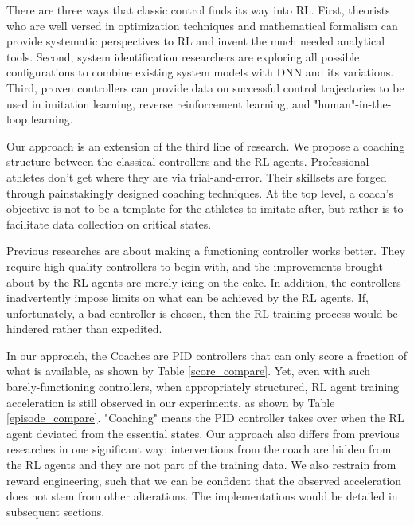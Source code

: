 There are three ways that classic control finds its way into RL. First, theorists who are well versed in optimization techniques and mathematical formalism can provide systematic perspectives to RL and invent the much needed analytical tools\cite{Han2020ActorCriticRL}\cite{Weinan2017APO}\cite{Dupont2019AugmentedNO}\cite{Betancourt2018OnSO}\cite{Nachum2020ReinforcementLV}. Second, system identification researchers are exploring all possible configurations to combine existing system models with DNN and its variations\cite{Hewing2020LearningBasedMP}\cite{Mohan2020EmbeddingHP}\cite{Lusch2018DeepLF}\cite{Bai2019DeepEM}\cite{BelbutePeres2020CombiningDP}. Third, proven controllers can provide data on successful control trajectories to be used in imitation learning, reverse reinforcement learning, and "human"-in-the-loop learning\cite{Knox2009InteractivelySA}\cite{Knox2010CombiningMF}\cite{Peng2018DeepMimicED}\cite{Peng2020LearningAR}\cite{Paine2018OneShotHI}.

Our approach is an extension of the third line of research. We propose a coaching structure between the classical controllers and the RL agents. Professional athletes don't get where they are via trial-and-error. Their skillsets are forged through painstakingly designed coaching techniques. At the top level, a coach's objective is not to be a template for the athletes to imitate after, but rather is to facilitate data collection on critical states. 

Previous researches\cite{Xie2018LearningWT}\cite{Carlucho2017IncrementalQS}\cite{Pavse2020RIDMRI} are about making a functioning controller works better. They require high-quality controllers to begin with, and the improvements brought about by the RL agents are merely icing on the cake. In addition, the controllers inadvertently impose limits on what can be achieved by the RL agents. If, unfortunately, a bad controller is chosen, then the RL training process would be hindered rather than expedited. 

In our approach, the Coaches are PID controllers that can only score a fraction of what is available, as shown by Table \ref{score_compare}. Yet, even with such barely-functioning controllers, when appropriately structured, RL agent training acceleration is still observed in our experiments, as shown by Table \ref{episode_compare}. "Coaching" means the PID controller takes over when the RL agent deviated from the essential states. Our approach also differs from previous researches in one significant way: interventions from the coach are hidden from the RL agents and they are not part of the training data. We also restrain from reward engineering, such that we can be confident that the observed acceleration does not stem from other alterations. The implementations would be detailed in subsequent sections.

